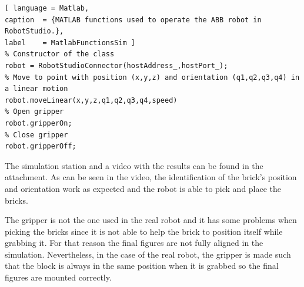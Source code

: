 \begin{lstlisting}[ language = Matlab,
caption  = {MATLAB functions used to operate the ABB robot in RobotStudio.},
label    = MatlabFunctionsSim ]
% Constructor of the class
robot = RobotStudioConnector(hostAddress_,hostPort_);
% Move to point with position (x,y,z) and orientation (q1,q2,q3,q4) in a linear motion
robot.moveLinear(x,y,z,q1,q2,q3,q4,speed)
% Open gripper
robot.gripperOn;
% Close gripper
robot.gripperOff;
\end{lstlisting}

The simulation station and a video with the results can be found in the attachment. 
As can be seen in the video, the identification of the brick's position and orientation work as expected and the robot is able to pick and place the bricks. 

The gripper is not the one used in the real robot and it has some problems when picking the bricks since it is not able to help the brick to position itself while grabbing it. For that reason the final figures are not fully aligned in the simulation. Nevertheless, in the case of the real robot, the gripper is made such that the block is always in the same position when it is grabbed so the final figures are mounted correctly.
